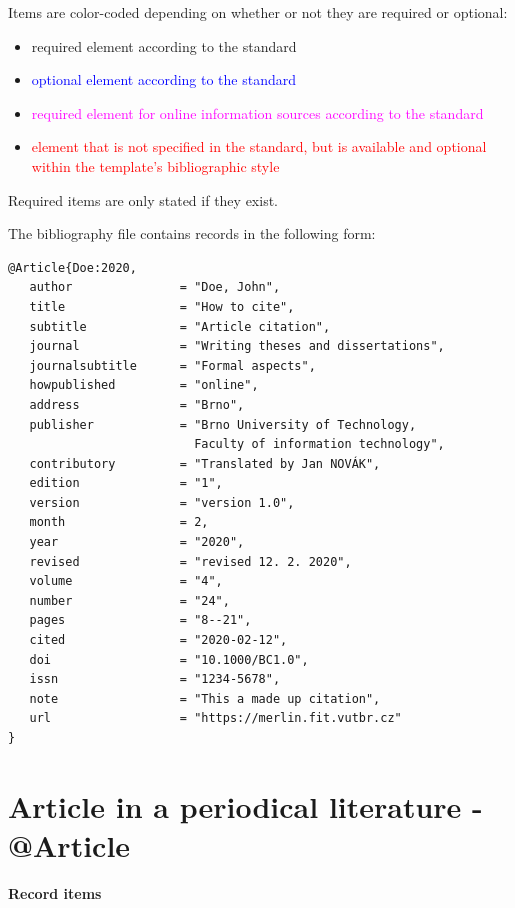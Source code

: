 \noindent Items are color-coded depending on whether or not they are required or optional:
\begin{itemize}
    \item required element according to the standard
    \item \textcolor{blue}{optional element according to the standard}
    \item \textcolor{magenta}{required element for online information sources according to the standard}
    \item \textcolor{red}{element that is not specified in the standard, but is available and optional within the template's bibliographic style}
\end{itemize}
Required items are only stated if they exist.

\newpage
The bibliography file contains records in the following form:
\begin{verbatim}
@Article{Doe:2020,
   author               = "Doe, John",
   title                = "How to cite",
   subtitle             = "Article citation",
   journal              = "Writing theses and dissertations",
   journalsubtitle      = "Formal aspects",
   howpublished         = "online",
   address              = "Brno",
   publisher            = "Brno University of Technology, 
                          Faculty of information technology",
   contributory         = "Translated by Jan NOVÁK",
   edition              = "1",
   version              = "version 1.0",
   month                = 2,
   year                 = "2020",
   revised              = "revised 12. 2. 2020",
   volume               = "4",
   number               = "24",
   pages                = "8--21",
   cited                = "2020-02-12",
   doi                  = "10.1000/BC1.0",
   issn                 = "1234-5678",
   note                 = "This a made up citation",
   url                  = "https://merlin.fit.vutbr.cz"
}
\end{verbatim}


\newpage
\section*{Article in a periodical literature - @Article}
\label{pr-casopis-clanek}
\noindent \textbf{Record items}

\medskip

